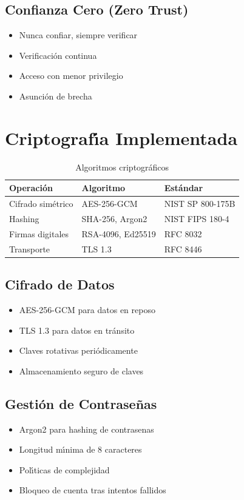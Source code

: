 \subsection{Confianza Cero (Zero Trust)}
\begin{itemize}
\item Nunca confiar, siempre verificar
\item Verificaci\'on continua
\item Acceso con menor privilegio
\item Asunci\'on de brecha
\end{itemize}

\section{Criptograf\'{\i}a Implementada}

\begin{table}[H]
\centering
\caption{Algoritmos criptogr\'aficos}
\begin{tabular}{|l|l|p{4cm}|}
\hline
\textbf{Operaci\'on} & \textbf{Algoritmo} & \textbf{Est\'andar} \\ \hline
Cifrado sim\'etrico & AES-256-GCM & NIST SP 800-175B \\ \hline
Hashing & SHA-256, Argon2 & NIST FIPS 180-4 \\ \hline
Firmas digitales & RSA-4096, Ed25519 & RFC 8032 \\ \hline
Transporte & TLS 1.3 & RFC 8446 \\ \hline
\end{tabular}
\end{table}

\subsection{Cifrado de Datos}
\begin{itemize}
\item AES-256-GCM para datos en reposo
\item TLS 1.3 para datos en tr\'ansito
\item Claves rotativas peri\'odicamente
\item Almacenamiento seguro de claves
\end{itemize}

\subsection{Gesti\'on de Contrase\~nas}
\begin{itemize}
\item Argon2 para hashing de contrasenas
\item Longitud m\'{\i}nima de 8 caracteres
\item Pol\'{\i}ticas de complejidad
\item Bloqueo de cuenta tras intentos fallidos
\end{itemize}

